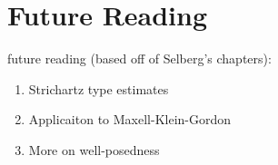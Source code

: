 \documentclass{book}
\newcommand{\R}{{\mathbb{R}}}
\begin{document}




\chapter{Future Reading}

future reading (based off of Selberg's chapters):
\begin{enumerate}
	\item Strichartz type estimates
	\item Applicaiton to Maxell-Klein-Gordon
	\item More on well-posedness
\end{enumerate}
\end{document}
